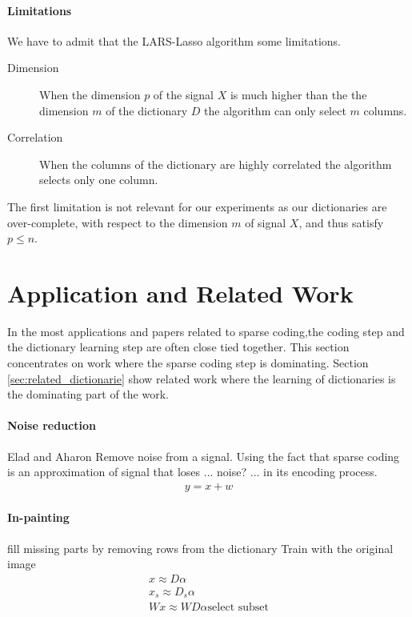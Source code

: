 \paragraph{Limitations}
We have to admit that the LARS-Lasso algorithm some limitations.
\begin{description}
 \item[Dimension] When the dimension $p$ of the signal $X$ is much higher than
the the dimension $m$ of the dictionary $D$ the algorithm can only select $m$
columns.
  \item[Correlation] When the columns of the dictionary are highly correlated
the algorithm selects only one column.
\end{description}
The first limitation is not relevant for our experiments as our dictionaries
are over-complete, with respect to the dimension $m$ of signal $X$, and thus
satisfy $p\leq n$. 

\section{Application and Related Work}
In the most applications and papers related to sparse coding,the coding
step and the dictionary learning step are often close tied together. This
section concentrates on work where the sparse coding step is dominating. Section
\ref{sec:related_dictionarie} show related work where the learning of
dictionaries is the dominating part of the work.

\paragraph{Noise reduction}
Elad and Aharon\cite{Elad2006}
Remove noise from a signal. 
Using the fact that sparse coding is an approximation of signal that loses ...
noise? ... in its encoding process. 
\begin{align*}
y = x + w
\end{align*}

\paragraph{In-painting}
fill missing parts by removing rows from the dictionary
Train with the original image
\begin{align*}
x \approx D\alpha\\
x_s \approx D_s\alpha\\
Wx \approx WD\alpha\text{select subset}\\
\end{align*}
\cite{mairal08sparse}


